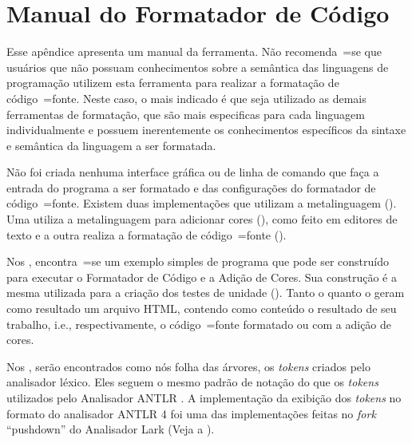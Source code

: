 

\chapter[Manual do Formatador]{Manual do Formatador de Código}
\label{manualDoFormatadorDeCodigo}


Esse apêndice apresenta um manual da ferramenta.
Não recomenda~=se que usuários que não possuam conhecimentos sobre a semântica das linguagens de programação\advisor{}{,
} utilizem esta ferramenta para realizar a formatação de código~=fonte.
Neste caso,
o mais indicado é que seja utilizado as demais ferramentas de formatação,
que são mais especificas para cada linguagem individualmente e
possuem inerentemente os conhecimentos específicos da sintaxe e
semântica da linguagem a ser formatada.

Não foi criada nenhuma interface gráfica ou
de linha de comando que faça a entrada do programa a ser formatado e
das configurações do formatador de código~=fonte.
Existem duas implementações que utilizam a metalinguagem ().
Uma utiliza a metalinguagem para adicionar cores (),
como feito em editores de texto e
a outra realiza a formatação de código~=fonte ().

Nos ,
encontra~=se um exemplo simples de programa que pode ser construído para executar o Formatador de Código e
a Adição de Cores.
Sua construção é a mesma utilizada para a criação dos testes de unidade ().
Tanto o  quanto o  geram como resultado um arquivo HTML,
contendo como conteúdo o resultado de seu trabalho,
i.e., respectivamente,
o código~=fonte formatado ou
com a adição de cores.

Nos ,
serão encontrados como nós folha das árvores,
os \textit{tokens} criados pelo analisador léxico.
Eles seguem o mesmo padrão de notação do que os \textit{tokens} utilizados pelo Analisador ANTLR \cite{antlrBookTerrentParr}.
A implementação da exibição dos \textit{tokens} no formato do analisador ANTLR 4 foi uma das implementações feitas no \textit{fork} ``pushdown'' do Analisador Lark (Veja a ).

